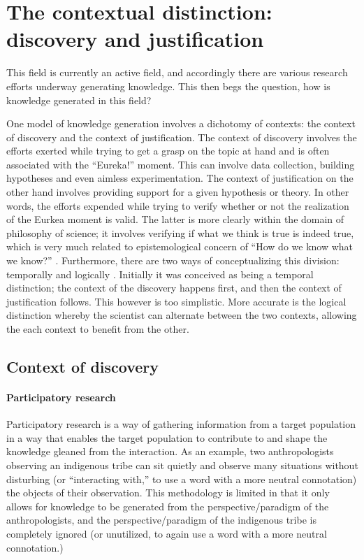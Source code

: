 \documentclass[a4paper]{article}
\begin{document}
\newpage
\section{The contextual distinction: discovery and justification}

This field is currently an active field, and accordingly there are various
research efforts underway generating knowledge. This then begs the question,
how is knowledge generated in this field?  


One model of knowledge generation involves a dichotomy of contexts: the
context of discovery and the context of justification. The context of
discovery involves the efforts exerted while trying to get a grasp on the
topic at hand and is often associated with the ``Eureka!'' moment. This can
involve data collection, building hypotheses and even aimless experimentation.
The context of justification on the other hand involves providing support for
a given hypothesis or theory. In other words, the efforts expended while
trying to verify whether or not the realization of the Eurkea moment is valid.
The latter is more clearly within the domain of philosophy of science; it
involves verifying if what we think is true is indeed true, which is very much
related to epistemological concern of ``How do we know what we know?''
\citep{schickore2014scientific}. Furthermore, there are two ways of
conceptualizing this division: temporally and logically
\citep{schickore2006introduction}.  Initially it was conceived as being a
temporal distinction; the context of the discovery happens first, and then the
context of justification follows. This however is too simplistic.  More
accurate is the logical distinction whereby the scientist can alternate
between the two contexts, allowing the each context to benefit from the other.

\subsection{Context of discovery}

\paragraph{Participatory research}
\label{part}

Participatory research is a way of gathering information from a target
population in a way that enables the target population to contribute to and
shape the knowledge gleaned from the interaction. As an example, two
anthropologists observing an indigenous tribe can sit quietly and observe many
situations without disturbing (or ``interacting with,'' to use a word with a
more neutral connotation) the objects of their observation. This methodology
is limited in that it only allows for knowledge to be generated from the
perspective/paradigm of the anthropologists, and the perspective/paradigm of
the indigenous tribe is completely ignored (or unutilized, to again use a word
with a more neutral connotation.)
\end{document}
